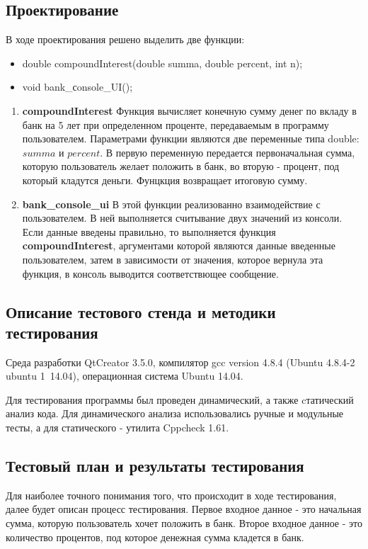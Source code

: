 \documentclass[12pt,a4paper]{report}
\begin{document}
\subsection{Проектирование}
\hspace{\parindent}
В ходе проектирования решено выделить две функции:
\begin{itemize}
\item double compoundInterest(double summa, double percent, int n);
\item void bank\_сonsole\_UI();
\end{itemize}
	\begin{enumerate}
	
		\item \textbf{compoundInterest}
		Функция вычисляет конечную сумму денег по вкладу в банк на 5 лет при определенном проценте, передаваемым в программу пользователем.
		 Параметрами функции являются две переменные типа double: $summa$ и $percent$. В первую переменную передается первоначальная сумма, которую пользователь желает положить в банк, во вторую - процент, под который кладутся деньги. Фунцкция возвращает итоговую сумму.
		 
		\item \textbf{bank\_console\_ui}
		 В этой функции реализованно взаимодействие с пользователем. В ней выполняется считывание двух значений из консоли. Если данные введены правильно, то выполняется функция \textbf{compoundInterest}, аргументами которой являются данные введенные пользователем, затем в зависимости от значения, которое вернула эта функция, в  консоль выводится соответствющее сообщение. 		
	\end{enumerate}
	
\subsection{Описание тестового стенда и методики тестирования}
\hspace{\parindent}
Среда разработки QtCreator 3.5.0, компилятор gcc version 4.8.4 (Ubuntu 4.8.4-2 ubuntu 1~14.04), операционная система Ubuntu 14.04. 

Для тестирования программы был проведен динамический, а также cтатический анализ кода. Для динамического анализа использовались ручные и модульные тесты, а для статического - утилита Cppcheck 1.61.

\subsection{Тестовый план и результаты тестирования}
\hspace{\parindent}
Для наиболее точного понимания того, что происходит в ходе тестирования, далее будет описан процесс тестирования. Первое входное данное - это начальная сумма, которую пользователь хочет положить в банк. Второе входное данное - это количество процентов, под которое денежная сумма кладется в банк.
\end{document}
